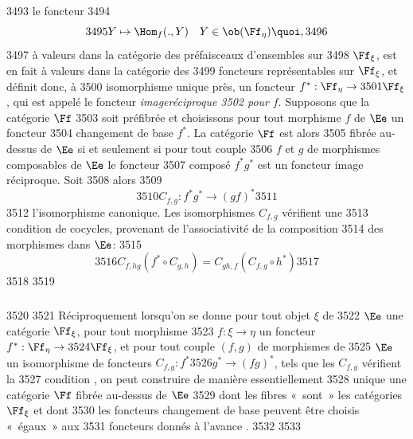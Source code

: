   3493	le foncteur
  3494	$$
  3495	Y \mapsto \Hom_f(., Y)\quad Y \in \ob (\Ff_{\eta}){\quoi},
  3496	$$
  3497	à valeurs dans la catégorie des préfaisceaux d'ensembles sur
  3498	$\Ff_{\xi}$, est en fait à valeurs dans la catégorie des
  3499	foncteurs représentables sur $\Ff_{\xi}$, et définit donc, à
  3500	isomorphisme unique près, un foncteur $f^{\ast} : \Ff_{\eta} \to
  3501	\Ff_{\xi}$, qui est appelé le foncteur \emph{image\pageoriginale réciproque
  3502	   pour} $f$. Supposons que la catégorie $\Ff$
  3503	soit préfibrée et choisissons pour tout morphisme $f$ de $\Ee$ un foncteur
  3504	changement de base $f^{\ast}$. La catégorie $\Ff$ est alors
  3505	fibrée au-dessus de $\Ee$ si et seulement si pour tout couple
  3506	$f$ et $g$ de morphismes composables de $\Ee$ le foncteur
  3507	composé $f^{\ast}g^{\ast}$ est un foncteur image réciproque. Soit
  3508	alors
  3509	\begin{equation*}
  3510	C_{f, g} : f^{\ast} g^{\ast} \to (gf)^{\ast}\tag{6.1.2.1}
  3511	\end{equation*}
  3512	l'isomorphisme canonique. Les isomorphismes $C_{f,g}$ vérifient une
  3513	condition de cocycles, provenant de l'associativité de la composition
  3514	des morphismes dans $\Ee$:
  3515	\begin{equation*}
  3516	C_{f, hg}(f^{\ast} \circ C_{g, h}) = C_{gh, f}(C_{f, g} \circ h^{\ast})\tag{6.1.2.2}
  3517	\end{equation*}
  3518	
  3519	\subsubsection{}
  3520	
  3521	Réciproquement lorsqu'on se donne pour tout objet $\xi$ de
  3522	$\Ee$ une catégorie $\Ff_{\xi}$, pour tout morphisme
  3523	$f : \xi \to \eta$ un foncteur $f^{\ast} : \Ff_\eta \to
  3524	\Ff_{\xi}$, et pour tout couple $(f, g)$ de morphismes de
  3525	$\Ee$ un isomorphisme de foncteurs $C_{f, g} : f^{\ast}
  3526	g^{\ast} \to (fg)^{\ast}$, tels que les $C_{f, g}$ vérifient la
  3527	condition , on peut construire de manière essentiellement
  3528	unique une catégorie $\Ff$ fibrée au-dessus de $\Ee$
  3529	dont les fibres « sont » les catégories $\Ff_{\xi}$ et dont
  3530	les foncteurs changement de base peuvent être choisis « égaux » aux
  3531	foncteurs donnés à l'avance \cite{5}.
  3532	
  3533	\subsubsection{}
